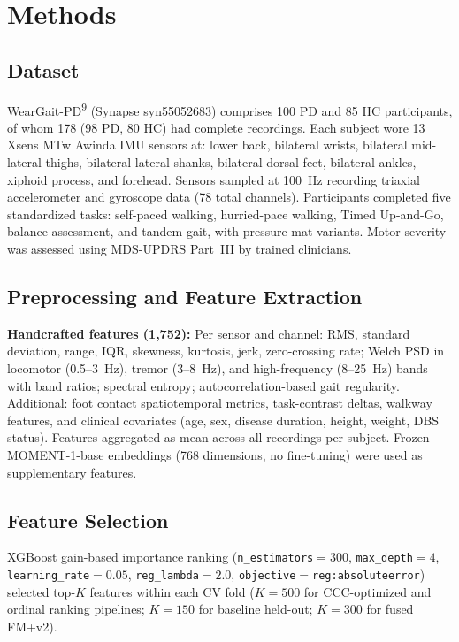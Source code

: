 \documentclass[11pt,a4paper]{article}
\begin{document}
\section{Methods}

\subsection{Dataset}

WearGait-PD\textsuperscript{9} (Synapse syn55052683) comprises 100 PD and 85 HC participants, of whom 178 (98 PD, 80 HC) had complete recordings. Each subject wore 13 Xsens MTw Awinda IMU sensors at: lower back, bilateral wrists, bilateral mid-lateral thighs, bilateral lateral shanks, bilateral dorsal feet, bilateral ankles, xiphoid process, and forehead. Sensors sampled at 100~Hz recording triaxial accelerometer and gyroscope data (78 total channels). Participants completed five standardized tasks: self-paced walking, hurried-pace walking, Timed Up-and-Go, balance assessment, and tandem gait, with pressure-mat variants. Motor severity was assessed using MDS-UPDRS Part~III by trained clinicians.

\subsection{Preprocessing and Feature Extraction}

\textbf{Handcrafted features (1,752):} Per sensor and channel: RMS, standard deviation, range, IQR, skewness, kurtosis, jerk, zero-crossing rate; Welch PSD in locomotor (0.5--3~Hz), tremor (3--8~Hz), and high-frequency (8--25~Hz) bands with band ratios; spectral entropy; autocorrelation-based gait regularity. Additional: foot contact spatiotemporal metrics, task-contrast deltas, walkway features, and clinical covariates (age, sex, disease duration, height, weight, DBS status). Features aggregated as mean across all recordings per subject. Frozen MOMENT-1-base embeddings (768 dimensions, no fine-tuning) were used as supplementary features.

\subsection{Feature Selection}

XGBoost gain-based importance ranking (\texttt{n\_estimators}$=300$, \texttt{max\_depth}$=4$, \texttt{learning\_rate}$=0.05$, \texttt{reg\_lambda}$=2.0$, \texttt{objective}$=$\texttt{reg:absoluteerror}) selected top-$K$ features within each CV fold ($K=500$ for CCC-optimized and ordinal ranking pipelines; $K=150$ for baseline held-out; $K=300$ for fused FM+v2).
\end{document}
